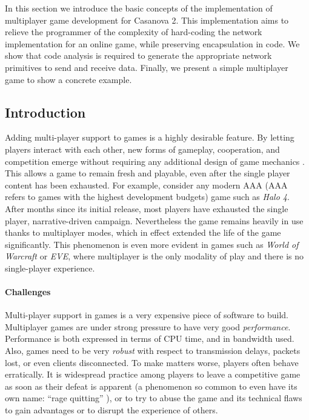 In this section we introduce the basic concepts of the implementation of multiplayer game development for Casanova 2. This implementation aims to relieve the programmer of the complexity of hard-coding the network implementation for an online game, while preserving encapsulation in code. We show that code analysis is required to generate the appropriate network primitives to send and receive data. Finally, we present a simple multiplayer game to show a concrete example.

\subsection{Introduction}
Adding multi-player support to games is a highly desirable feature. By letting players interact with each other, new forms of gameplay, cooperation, and competition emerge without requiring any additional design of game mechanics \cite{granberg2014david}. This allows a game to remain fresh and playable, even after the single player content has been exhausted. For example, consider any modern AAA (AAA refers to games with the highest development budgets\cite{wolf2008video}) game such as \textit{Halo 4}. After months since its initial release, most players have exhausted the single player, narrative-driven campaign. Nevertheless the game remains heavily in use thanks to multiplayer modes, which in effect extended the life of the game significantly. This phenomenon is even more evident in games such as \textit{World of Warcraft} or \textit{EVE}, where multiplayer is the only modality of play and there is no single-player experience.

\paragraph{Challenges}
Multi-player support in games is a very expensive piece of software to build. Multiplayer games are under strong pressure to have very good \textit{performance}\cite{claypool2006latency}. Performance is both expressed in terms of CPU time, and in bandwidth used. Also, games need to be very \textit{robust} with respect to transmission delays, packets lost, or even clients disconnected. To make matters worse, players often behave erratically. It is widespread practice among players to leave a competitive game as soon as their defeat is apparent (a phenomenon so common to even have its own name: ``rage quitting'' \cite{rage_quitting}), or to try to abuse the game and its technical flaws to gain advantages or to disrupt the experience of others.

